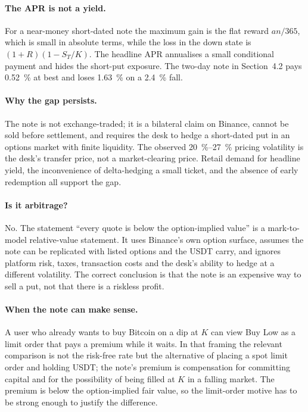 \documentclass[11pt]{article}
\begin{document}
\paragraph{The APR is not a yield.} For a near-money short-dated note the maximum gain is the flat reward $a n/365$, which is small in absolute terms, while the loss in the down state is $(1+R)(1-S_T/K)$. The headline APR annualises a small conditional payment and hides the short-put exposure. The two-day note in Section~4.2 pays \SI{0.52}{\percent} at best and loses \SI{1.63}{\percent} on a \SI{2.4}{\percent} fall.

\paragraph{Why the gap persists.} The note is not exchange-traded; it is a bilateral claim on Binance, cannot be sold before settlement, and requires the desk to hedge a short-dated put in an options market with finite liquidity. The observed \SI{20}{\percent}--\SI{27}{\percent} pricing volatility is the desk's transfer price, not a market-clearing price. Retail demand for headline yield, the inconvenience of delta-hedging a small ticket, and the absence of early redemption all support the gap.

\paragraph{Is it arbitrage?} No. The statement ``every quote is below the option-implied value'' is a mark-to-model relative-value statement. It uses Binance's own option surface, assumes the note can be replicated with listed options and the USDT carry, and ignores platform risk, taxes, transaction costs and the desk's ability to hedge at a different volatility. The correct conclusion is that the note is an expensive way to sell a put, not that there is a riskless profit.

\paragraph{When the note can make sense.} A user who already wants to buy Bitcoin on a dip at $K$ can view Buy Low as a limit order that pays a premium while it waits. In that framing the relevant comparison is not the risk-free rate but the alternative of placing a spot limit order and holding USDT; the note's premium is compensation for committing capital and for the possibility of being filled at $K$ in a falling market. The premium is below the option-implied fair value, so the limit-order motive has to be strong enough to justify the difference.
\end{document}

